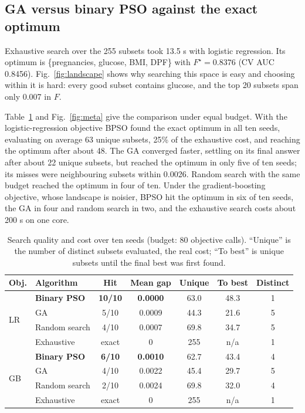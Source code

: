 \documentclass[conference]{IEEEtran}
\begin{document}
\subsection{GA versus binary PSO against the exact optimum}
Exhaustive search over the 255 subsets took 13.5 s with logistic regression. Its optimum is \{pregnancies, glucose, BMI, DPF\} with $F^\star=0.8376$ (CV AUC 0.8456). Fig.~\ref{fig:landscape} shows why searching this space is easy and choosing within it is hard: every good subset contains glucose, and the top 20 subsets span only 0.007 in $F$.

Table~\ref{tab:meta} and Fig.~\ref{fig:meta} give the comparison under equal budget. With the logistic-regression objective BPSO found the exact optimum in all ten seeds, evaluating on average 63 unique subsets, 25\% of the exhaustive cost, and reaching the optimum after about 48. The GA converged faster, settling on its final answer after about 22 unique subsets, but reached the optimum in only five of ten seeds; its misses were neighbouring subsets within 0.0026. Random search with the same budget reached the optimum in four of ten. Under the gradient-boosting objective, whose landscape is noisier, BPSO hit the optimum in six of ten seeds, the GA in four and random search in two, and the exhaustive search costs about 200 s on one core.

\begin{table}[!tb]
\centering
\caption{Search quality and cost over ten seeds (budget: 80 objective calls). ``Unique'' is the number of distinct subsets evaluated, the real cost; ``To best'' is unique subsets until the final best was first found.}
\label{tab:meta}
\footnotesize
\setlength{\tabcolsep}{3pt}
\begin{tabular}{@{}llccccc@{}}
\toprule
Obj. & Algorithm & Hit & Mean gap & Unique & To best & Distinct \\
\midrule
\multirow{4}{*}{LR} & \textbf{Binary PSO} & \textbf{10/10} & \textbf{0.0000} & 63.0 & 48.3 & 1 \\
 & GA & 5/10 & 0.0009 & 44.3 & 21.6 & 5 \\
 & Random search & 4/10 & 0.0007 & 69.8 & 34.7 & 5 \\
 & Exhaustive & exact & 0 & 255 & n/a & 1 \\
\midrule
\multirow{4}{*}{GB} & \textbf{Binary PSO} & \textbf{6/10} & \textbf{0.0010} & 62.7 & 43.4 & 4 \\
 & GA & 4/10 & 0.0022 & 45.4 & 29.7 & 5 \\
 & Random search & 2/10 & 0.0024 & 69.8 & 32.0 & 4 \\
 & Exhaustive & exact & 0 & 255 & n/a & 1 \\
\bottomrule
\end{tabular}
\end{table}
\end{document}
